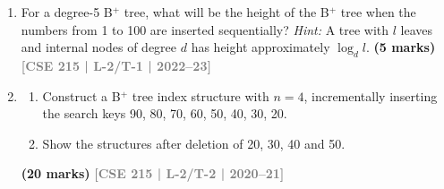 \documentclass[12pt,a3paper]{article}
\newcommand{\yr}[1]{\hfill\textcolor{gray}{\small\textbf{[#1]}}}
\newcommand{\mk}[1]{\textcolor{orange!70!black}{\small\textbf{(#1 marks)}}}
\begin{document}
\begin{enumerate}
\begin{center}

\end{center}
Draw the state of this B$^+$ tree after each of the following operations:
\begin{enumerate}
  \item Insert 315
  \item Insert 409 and 513
  \item Delete 456
  \item Delete 513
  \item Delete 982 and 895
\end{enumerate}
\mk{20} \yr{CSE 215 | L-2/T-1 | 2022--23}

\item For a degree-5 B$^+$ tree, what will be the height of the B$^+$ tree when the numbers from 1 to 100 are inserted sequentially? \textit{Hint:} A tree with $l$ leaves and internal nodes of degree $d$ has height approximately $\log_d l$.
\mk{5} \yr{CSE 215 | L-2/T-1 | 2022--23}

\item
\begin{enumerate}
  \item Construct a B$^+$ tree index structure with $n = 4$, incrementally inserting the search keys 90, 80, 70, 60, 50, 40, 30, 20.
  \item Show the structures after deletion of 20, 30, 40 and 50.
\end{enumerate}
\mk{20} \yr{CSE 215 | L-2/T-2 | 2020--21}


\end{enumerate}
\end{document}
